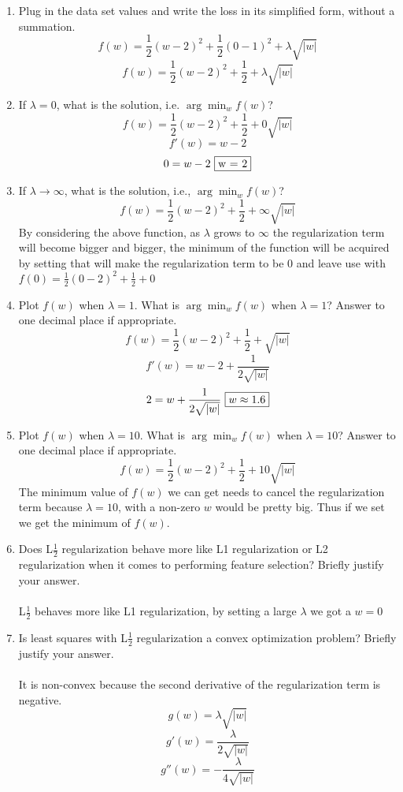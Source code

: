 \documentclass{article}
\def\ans#1{{\color{ans}#1}}
\def\half{\frac 1 2}
\begin{document}
\begin{enumerate}
\item Plug in the data set values and write the loss in its simplified form, without a summation. \\
\ans{
    \[ f(w) = \half (w - 2)^2 + \half(0 - 1)^2 + \lambda\sqrt{|w|} \]
    \[ f(w) = \half (w - 2)^2 + \half + \lambda\sqrt{|w|} \]
}
\item If $\lambda=0$, what is the solution, i.e. $\arg \min_w f(w)$?
\ans{
    \[ f(w) = \half (w - 2)^2 + \half + 0\sqrt{|w|} \]
    \[ f'(w) = w - 2\]
    \[ 0 = w - 2 \text{ } \fbox{w = 2} \]
}
\item If $\lambda\rightarrow \infty$, what is the solution, i.e., $\arg \min_w f(w)$?
\ans{
    \[ f(w) = \half (w - 2)^2 + \half + \infty\sqrt{|w|} \]
    By considering the above function, as $\lambda$ grows to $\infty$ the regularization term will become
    bigger and bigger, the minimum of the function will be acquired by setting \fbox{$w = 0$} that will make 
    the regularization term to be 0 and leave use with $f(0) = \half (0 - 2)^2 + \half + 0$
}
\item Plot $f(w)$ when $\lambda = 1$. What is $\arg \min_w f(w)$ when $\lambda=1$? Answer to one decimal place if appropriate.
\ans{
    \[ f(w) = \half (w - 2)^2 + \half + \sqrt{|w|} \]
    \[ f'(w) = w - 2 + \frac{1}{2\sqrt{|w|}}\]
    \[ 2 = w + \frac{1}{2\sqrt{|w|}} \text{  \fbox{$w \approx 1.6$}} \]
}
\item Plot $f(w)$ when $\lambda = 10$. What is $\arg \min_w f(w)$ when $\lambda=10$? Answer to one decimal place if appropriate.
\ans{
    \[ f(w) = \half (w - 2)^2 + \half + 10\sqrt{|w|} \]
    The minimum value of $f(w)$ we can get needs to cancel the regularization term because $\lambda=10$, 
    with a non-zero $w$ would be pretty big. Thus if we set \fbox{$w = 0$} we get the minimum of $f(w)$.
}
\item Does L$\frac12$ regularization behave more like L1 regularization or L2 regularization
when it comes to performing feature selection? Briefly justify your answer. \\ \\
\ans{
    L$\frac12$ behaves more like L1 regularization, by setting a large $\lambda$ we got a $w = 0$
}
\item Is least squares with L$\frac12$ regularization 
a convex optimization problem? Briefly justify your answer.\\ \\
\ans{
It is non-convex because the second derivative of the regularization term is negative.
\[ g(w) = \lambda\sqrt{|w|} \]
\[ g'(w) = \frac{\lambda}{2\sqrt{|w|}} \]
\[ g''(w) = - \frac{\lambda}{4\sqrt{|w|}} \]
}
\end{enumerate}
\end{document}
